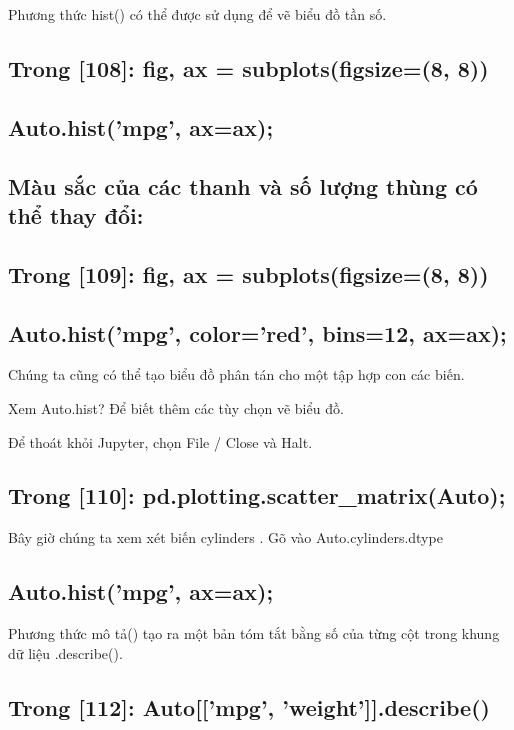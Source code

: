 Phương thức hist() có thể được sử dụng để vẽ biểu đồ tần số.

\subsection{Trong [108]: fig, ax = subplots(figsize=(8, 8))}

\subsection{Auto.hist('mpg', ax=ax);}

\subsection{Màu sắc của các thanh và số lượng thùng có thể thay đổi:}

\subsection{Trong [109]: fig, ax = subplots(figsize=(8, 8))}

\subsection{Auto.hist('mpg', color='red', bins=12, ax=ax);}

Chúng ta cũng có thể tạo biểu đồ phân tán cho một tập hợp con các biến.

Xem Auto.hist? Để biết thêm các tùy chọn vẽ biểu đồ.

Để thoát khỏi Jupyter, chọn File / Close và Halt.

\subsection{Trong [110]: pd.plotting.scatter\_matrix(Auto);}

Bây giờ chúng ta xem xét biến cylinders . Gõ vào Auto.cylinders.dtype

\subsection{Auto.hist('mpg', ax=ax);}

Phương thức mô tả() tạo ra một bản tóm tắt bằng số của từng cột trong khung dữ liệu .describe().

\subsection{Trong [112]: Auto[['mpg', 'weight']].describe()}

